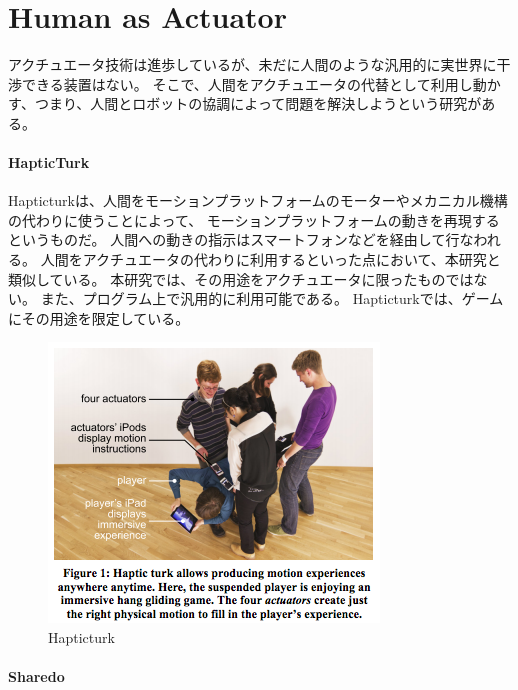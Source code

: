 \section{Human as Actuator}\label{human-as-actuator}

アクチュエータ技術は進歩しているが、未だに人間のような汎用的に実世界に干渉できる装置はない。
そこで、人間をアクチュエータの代替として利用し動かす、つまり、人間とロボットの協調によって問題を解決しようという研究がある。

\paragraph{HapticTurk}\label{hapticturk}

\mbox{}

Hapticturk\cite{hapticturk}は、人間をモーションプラットフォームのモーターやメカニカル機構の代わりに使うことによって、
モーションプラットフォームの動きを再現するというものだ。
人間への動きの指示はスマートフォンなどを経由して行なわれる。
人間をアクチュエータの代わりに利用するといった点において、本研究と類似している。
本研究では、その用途をアクチュエータに限ったものではない。
また、プログラム上で汎用的に利用可能である。
Hapticturkでは、ゲームにその用途を限定している。

\begin{figure}[htbp]
  \begin{center}
  \includegraphics[width=.6\linewidth,bb=0 0 332 281]{images/hapticturk.png}
  \end{center}
  \caption{Hapticturk}
  \label{fig:hapticturk}
\end{figure}

\paragraph{Sharedo}\label{sharedo}

\mbox{}

